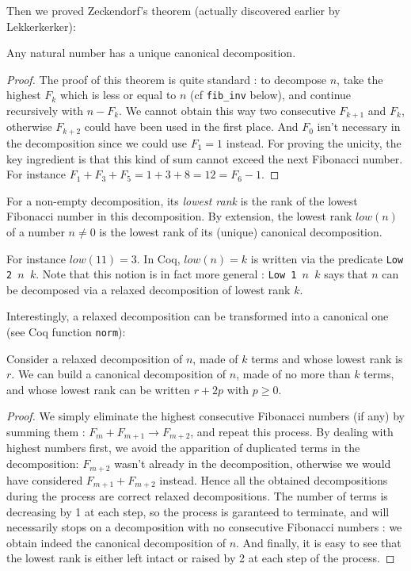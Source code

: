 \documentclass[a4paper,11pt]{article}
\begin{document}
Then we proved Zeckendorf's theorem (actually discovered earlier by Lekkerkerker):

\begin{theorem}[Zeckendorf]\label{zeck}
Any natural number has a unique canonical decomposition.
\end{theorem}

\begin{proof}
The proof of this theorem is quite standard : to decompose
$n$, take the highest $F_k$ which is less or equal to $n$
(cf {\tt fib\_inv} below),
and continue recursively with $n-F_k$. We cannot obtain this way
two consecutive $F_{k+1}$ and $F_k$, otherwise $F_{k+2}$ could have
been used in the first place. And $F_0$ isn't necessary in the
decomposition since we could use $F_1 = 1$ instead.
For proving the unicity, the key ingredient is that this kind of
sum cannot exceed the next Fibonacci number. For instance
$F_1+F_3+F_5 = 1+3+8 = 12 = F_6 - 1$.
\end{proof}

\begin{definition}
For a non-empty decomposition, its \emph{lowest rank} is the rank of
the lowest Fibonacci number in this decomposition. By extension,
the lowest rank $low(n)$ of a number $n\neq 0$ is the lowest
rank of its (unique) canonical decomposition.
\end{definition}
For instance $low(11)=3$. In Coq, $low(n)=k$ is written
via the predicate {\tt Low 2 $n$ $k$}. Note that this notion is
in fact more general : {\tt Low 1 $n$ $k$} says that $n$ can be
decomposed via a relaxed decomposition of lowest rank $k$.

Interestingly, a relaxed decomposition can be transformed into
a canonical one (see Coq function {\tt norm}):

\begin{theorem}[normalization]\label{norm}
Consider a relaxed decomposition of $n$, made of $k$ terms and
whose lowest rank is $r$. We can build a canonical decomposition
of $n$, made of no more than $k$ terms, and whose lowest rank can
be written $r+2p$ with $p\ge 0$.  
\end{theorem}
\begin{proof}
We simply eliminate the highest consecutive Fibonacci numbers (if any)
by summing them : $F_m+F_{m+1} \to F_{m+2}$, and repeat this
process. By dealing with highest numbers first, we avoid the apparition of
duplicated terms in the decomposition: $F_{m+2}$ wasn't already
in the decomposition, otherwise we would have considered
$F_{m+1}+F_{m+2}$ instead. Hence all the obtained decompositions
during the process are correct relaxed decompositions. The number of
terms is decreasing by 1 at each step, so the process is garanteed to
terminate, and will necessarily stops on a decomposition with no
consecutive Fibonacci numbers : we obtain indeed the canonical
decomposition of $n$. And finally, it is easy to see that the
lowest rank is either left intact or raised by 2 at each step
of the process.
\end{proof}
\end{document}
